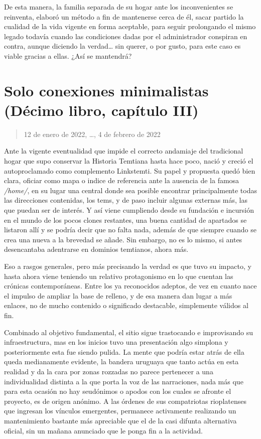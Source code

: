 \documentclass[
]{book}
\begin{document}
De esta manera, la familia separada de su hogar ante los inconvenientes se reinventa, elaboró un método a fin de mantenerse cerca de él, sacar partido la cualidad de la vida vigente en forma aceptable, para seguir prolongando el mismo legado todavía cuando las condiciones dadas por el administrador conspiran en contra, aunque diciendo la verdad\ldots{} sin querer, o por gusto, para este caso es viable gracias a ellas. ¿Así se mantendrá?

\hypertarget{solo-conexiones-minimalistas-duxe9cimo-libro-capuxedtulo-iii}{%
\section{Solo conexiones minimalistas (Décimo libro, capítulo III)}\label{solo-conexiones-minimalistas-duxe9cimo-libro-capuxedtulo-iii}}

\begin{quote}
12 de enero de 2022, \ldots, 4 de febrero de 2022
\end{quote}

Ante la vigente eventualidad que impide el correcto andamiaje del tradicional hogar que supo conservar la Historia Temtiana hasta hace poco, nació y creció el autoproclamado como complemento Linkstemti. Su papel y propuesta quedó bien clara, oficiar como mapa o indice de referencia ante la ausencia de la famosa \emph{/home/}, en su lugar una central donde sea posible encontrar principalmente todas las direcciones contenidas, los tems, y de paso incluir algunas externas más, las que puedan ser de interés. Y así viene cumpliendo desde su fundación e incursión en el mundo de los pocos clones restantes, una buena cantidad de apartados se listaron allí y se podría decir que no falta nada, además de que siempre cuando se crea una nueva a la brevedad se añade. Sin embargo, no es lo mismo, si antes desencantaba adentrarse en dominios temtianos, ahora más.

Eso a rasgos generales, pero más precisando la verdad es que tuvo su impacto, y hasta ahora viene teniendo un relativo protagonismo en lo que cuentan las crónicas contemporáneas. Entre los ya reconocidos adeptos, de vez en cuanto nace el impulso de ampliar la base de relleno, y de esa manera dan lugar a más enlaces, no de mucho contenido o significado destacable, simplemente válidos al fin.

Combinado al objetivo fundamental, el sitio sigue trastocando e improvisando su infraestructura, mas en los inicios tuvo una presentación algo simplona y posteriormente esta fue siendo pulida. La mente que podría estar atrás de ella queda medianamente evidente, la bandera uruguaya que tanto actúa en esta realidad y da la cara por zonas rozzadas no parece pertenecer a una individualidad distinta a la que porta la voz de las narraciones, nada más que para esta ocasión no hay seudónimos o apodos con los cuales se afronte el proyecto, es de origen anónimo. A las órdenes de sus compatriotas rioplatenses que ingresan los vínculos emergentes, permanece activamente realizando un mantenimiento bastante más apreciable que el de la casi difunta alternativa oficial, sin un mañana anunciado que le ponga fin a la actividad.
\end{document}
